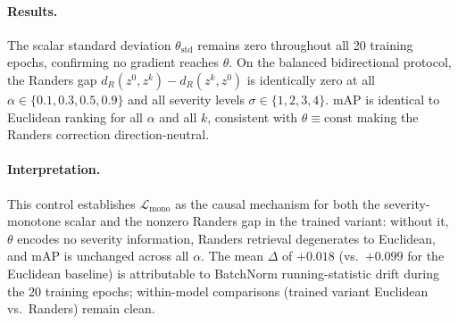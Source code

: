 \paragraph{Results.}
The scalar standard deviation $\theta_{\mathrm{std}}$ remains zero throughout all 20 training epochs, confirming no gradient reaches $\theta$. On the balanced bidirectional protocol, the Randers gap $d_R(z^0,z^k)-d_R(z^k,z^0)$ is identically zero at all $\alpha\!\in\!\{0.1,0.3,0.5,0.9\}$ and all severity levels $\sigma\!\in\!\{1,2,3,4\}$. mAP is identical to Euclidean ranking for all $\alpha$ and all $k$, consistent with $\theta\!\equiv\!\mathrm{const}$ making the Randers correction direction-neutral.

\begin{table}[h]
  \centering
  \caption{Disabled-loss control: balanced bidirectional mAP and Randers gap. Configuration identical to the trained variant, except $\mathcal{L}_{\mathrm{mono}}$ is disabled ($\lambda\!=\!0$). All Randers $\alpha$ values produce identical results to Euclidean ($\Delta\!=\!+0.018$, gap~$=\!0$).}
  \label{tab:toy_ablation}
\end{table}

\paragraph{Interpretation.}
This control establishes $\mathcal{L}_{\mathrm{mono}}$ as the causal mechanism for both the severity-monotone scalar and the nonzero Randers gap in the trained variant: without it, $\theta$ encodes no severity information, Randers retrieval degenerates to Euclidean, and mAP is unchanged across all $\alpha$. The mean $\Delta$ of $+0.018$ (vs.\ $+0.099$ for the Euclidean baseline) is attributable to BatchNorm running-statistic drift during the 20 training epochs; within-model comparisons (trained variant Euclidean vs.\ Randers) remain clean.

